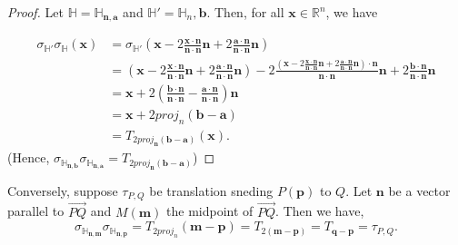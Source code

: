 \begin{proof}
 Let \( \mathbb{H} = \mathbb{H}_{\mathbf{n},\mathbf{a}} \) and \( \mathbb{H}' = \mathbb{H}_{n}, \mathbf{b}\). Then, for all
 \( \mathbf{x} \in \mathbb{R}^{n} \), we have

 \begin{align*}
   \sigma_{\mathbb{H}'} \sigma_{\mathbb{H}} \left(\mathbf{x}  \right) &= \sigma_{\mathbb{H}'} \left(\mathbf{x} - 2\frac{\mathbf{x \cdot \mathbf{n}}}{\mathbf{n} \cdot \mathbf{n}} \mathbf{n} + 2 \frac{\mathbf{a} \cdot \mathbf{n}}{\mathbf{n} \cdot \mathbf{n}} \mathbf{n}  \right) \\
                                                                      &= \left( \mathbf{x} - 2 \frac{\mathbf{x} \cdot \mathbf{n}}{\mathbf{n} \cdot \mathbf{n}} \mathbf{n} + 2 \frac{\mathbf{a} \cdot \mathbf{n}}{\mathbf{n} \cdot \mathbf{n}} \mathbf{n}\right) -  2 \frac{ \left( \mathbf{x} - 2 \frac{\mathbf{x} \cdot \mathbf{n}}{\mathbf{n} \cdot \mathbf{n}} \mathbf{n} + 2 \frac{\mathbf{a} \cdot \mathbf{n}}{\mathbf{n} \cdot \mathbf{n}} \mathbf{n} \right) \cdot \mathbf{n} }{\mathbf{n} \cdot \mathbf{n}} \mathbf{n} + 2 \frac{\mathbf{b} \cdot \mathbf{n}}{\mathbf{n} \cdot \mathbf{n}} \mathbf{n} \\
                                                                      &= \mathbf{x} + 2 \left( \frac{\mathbf{b} \cdot \mathbf{n}}{ \mathbf{n} \cdot \mathbf{n}} - \frac{\mathbf{a} \cdot \mathbf{n}}{\mathbf{n} \cdot \mathbf{n}} \right) \mathbf{n} \\ 
                                                                      &= \mathbf{x} + 2proj_{n} \left(\mathbf{b} - \mathbf{a}  \right) \\
                                                                      &= T_{2 proj_{\mathbf{n}} \left( \mathbf{b} - \mathbf{a} \right)} \mathbf{\left(\mathbf{x}  \right)}
                                                                    .\end{align*}
                                                                  (Hence, \( \sigma_{\mathbb{H}_{\mathbf{n}, \mathbf{b}}} \sigma_{\mathbb{H}_{\mathbf{n}, \mathbf{a}}}  = T_{2proj_{\mathbf{n}} \left( \mathbf{b} - \mathbf{a} \right)}\))
\end{proof}

Conversely, suppose \( \tau_{P,Q} \) be translation sneding \( P \left(\mathbf{p}  \right) \) to \( Q \).
Let \( \mathbf{n} \) be a vector parallel to \( \overrightarrow{PQ} \) and \( M(\mathbf{m}) \) the 
midpoint of \( \overrightarrow{PQ} \). Then we have,
\[
  \sigma_{\mathbb{H}_{\mathbf{n}, \mathbf{m}}} \sigma_{\mathbb{H}_{\mathbf{n}, \mathbf{p}}} = T_{2proj_{n}} \left( \mathbf{m} - \mathbf{p} \right) = T_{2(\mathbf{m - \mathbf{p}})} = T_{\mathbf{q} - \mathbf{p}} = \tau_{P,Q}
.\] 

